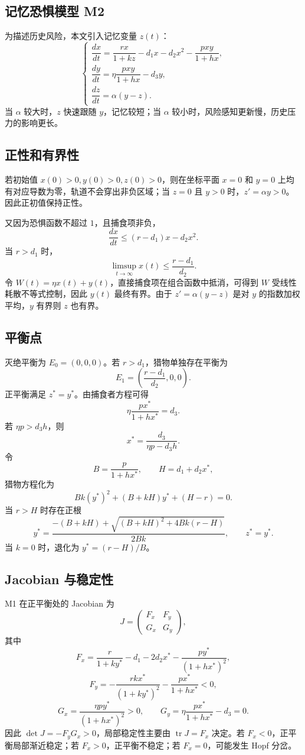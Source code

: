\documentclass{article}
\begin{document}
\subsection{记忆恐惧模型 M2}
为描述历史风险，本文引入记忆变量 $z(t)$：
\begin{equation}
\label{eq:m2}
\begin{cases}
\dfrac{dx}{dt}=\dfrac{rx}{1+kz}-d_1x-d_2x^2-\dfrac{pxy}{1+hx},\\[6pt]
\dfrac{dy}{dt}=\eta\dfrac{pxy}{1+hx}-d_3y,\\[6pt]
\dfrac{dz}{dt}=\alpha(y-z).
\end{cases}
\end{equation}
当 $\alpha$ 较大时，$z$ 快速跟随 $y$，记忆较短；当 $\alpha$ 较小时，风险感知更新慢，历史压力的影响更长。

\subsection{正性和有界性}
若初始值 $x(0)>0,y(0)>0,z(0)>0$，则在坐标平面 $x=0$ 和 $y=0$ 上均有对应导数为零，轨道不会穿出非负区域；当 $z=0$ 且 $y>0$ 时，$z'=\alpha y>0$。因此正初值保持正性。

又因为恐惧函数不超过 $1$，且捕食项非负，
\[
\frac{dx}{dt}\le (r-d_1)x-d_2x^2.
\]
当 $r>d_1$ 时，
\[
\limsup_{t\to\infty}x(t)\le \frac{r-d_1}{d_2}.
\]
令 $W(t)=\eta x(t)+y(t)$，直接捕食项在组合函数中抵消，可得到 $W$ 受线性耗散不等式控制，因此 $y(t)$ 最终有界。由于 $z'=\alpha(y-z)$ 是对 $y$ 的指数加权平均，$y$ 有界则 $z$ 也有界。

\subsection{平衡点}
灭绝平衡为 $E_0=(0,0,0)$。若 $r>d_1$，猎物单独存在平衡为
\[
E_1=\left(\frac{r-d_1}{d_2},0,0\right).
\]
正平衡满足 $z^\ast=y^\ast$。由捕食者方程可得
\[
\eta\frac{p x^\ast}{1+h x^\ast}=d_3.
\]
若 $\eta p>d_3h$，则
\[
x^\ast=\frac{d_3}{\eta p-d_3h}.
\]
令
\[
B=\frac{p}{1+h x^\ast},\qquad H=d_1+d_2x^\ast,
\]
猎物方程化为
\[
Bk(y^\ast)^2+(B+kH)y^\ast+(H-r)=0.
\]
当 $r>H$ 时存在正根
\[
y^\ast=
\frac{-(B+kH)+\sqrt{(B+kH)^2+4Bk(r-H)}}{2Bk},
\qquad z^\ast=y^\ast.
\]
当 $k=0$ 时，退化为 $y^\ast=(r-H)/B$。

\subsection{Jacobian 与稳定性}
M1 在正平衡处的 Jacobian 为
\[
J=
\begin{pmatrix}
F_x & F_y\\
G_x & G_y
\end{pmatrix},
\]
其中
\[
F_x=\frac{r}{1+ky^\ast}-d_1-2d_2x^\ast-\frac{p y^\ast}{(1+h x^\ast)^2},
\]
\[
F_y=-\frac{rkx^\ast}{(1+ky^\ast)^2}-\frac{px^\ast}{1+h x^\ast}<0,
\]
\[
G_x=\frac{\eta p y^\ast}{(1+h x^\ast)^2}>0,\qquad
G_y=\eta\frac{p x^\ast}{1+hx^\ast}-d_3=0.
\]
因此 $\det J=-F_yG_x>0$，局部稳定性主要由 $\operatorname{tr}J=F_x$ 决定。若 $F_x<0$，正平衡局部渐近稳定；若 $F_x>0$，正平衡不稳定；若 $F_x=0$，可能发生 Hopf 分岔。
\end{document}
